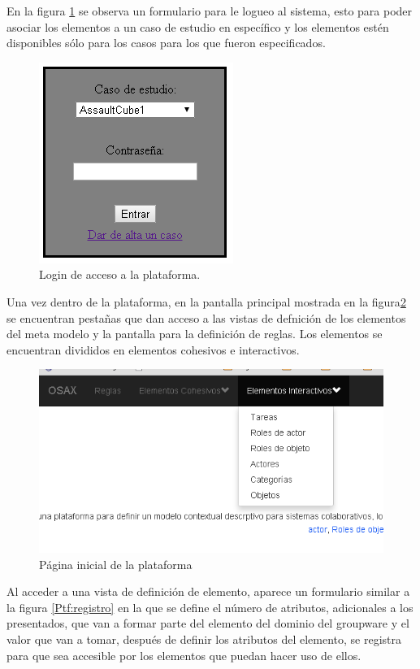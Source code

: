 En la figura \ref{Ptf:login} se observa un formulario para le logueo al sistema, esto para poder asociar los elementos a un caso de estudio en espec\'ifico y los elementos est\'en disponibles s\'olo para los casos para los que fueron especificados.
\newpage
\begin{figure}[h!]
\centering
\includegraphics[scale=.7]{images/LoginProto.png}
\caption{Login de acceso a la plataforma.}
\label{Ptf:login}
\end{figure}

Una  vez dentro de la plataforma, en la pantalla principal mostrada en la figura\ref{Ptf:home} se encuentran pesta\~nas que dan acceso a las vistas de defnici\'on de los elementos del meta modelo y la pantalla para la definici\'on de reglas. Los elementos se encuentran divididos en elementos cohesivos e interactivos.

\begin{figure}[h!]
\centering
\includegraphics[scale=.7]{images/homeProto.png}
\caption{P\'agina inicial de la plataforma}
\label{Ptf:home}
\end{figure}

Al acceder a una vista de definici\'on de elemento, aparece un formulario similar a  la figura \ref{Ptf:registro} en la que se define el n\'umero de atributos, adicionales a los presentados, que van a formar parte del elemento del dominio del groupware y el valor que van a tomar, despu\'es de definir los atributos del elemento, se registra para que sea accesible por los elementos que puedan hacer uso de ellos.
\newpage

